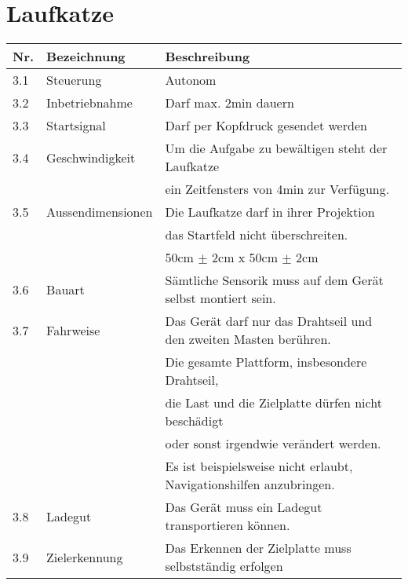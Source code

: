 \documentclass[a4paper]{report}
\begin{document}
\section{Laufkatze}
\begin{tabular}{|l|l|l|}
	\hline 
	\textbf{Nr.} & \textbf{Bezeichnung} & \textbf{Beschreibung} \\
	\hline 
	3.1 & Steuerung & Autonom \\
	\hline
	3.2 & Inbetriebnahme & Darf max. 2min dauern \\
	\hline
	3.3 & Startsignal & Darf per Kopfdruck gesendet werden \\
	\hline
	3.4 & Geschwindigkeit & Um die Aufgabe zu bewältigen steht der Laufkatze\\
	& & ein Zeitfensters von 4min zur Verfügung. \\
	\hline
	3.5 & Aussendimensionen & Die Laufkatze darf in ihrer Projektion\\
	& & das Startfeld nicht überschreiten.\\
	& & 50cm $\pm$ 2cm x 50cm $\pm$ 2cm \\
	\hline
	3.6 & Bauart & Sämtliche Sensorik muss auf dem Gerät selbst montiert sein. \\
	\hline
	3.7 & Fahrweise & Das Gerät darf nur das Drahtseil und den zweiten Masten berühren.\\
	& & Die gesamte Plattform, insbesondere Drahtseil,\\
	& & die Last und die Zielplatte dürfen nicht beschädigt\\
	& & oder sonst irgendwie verändert werden.\\
	& & Es ist beispielsweise nicht erlaubt, Navigationshilfen anzubringen. \\
	\hline
	3.8 & Ladegut & Das Gerät muss ein Ladegut transportieren können. \\
	\hline
	3.9 & Zielerkennung & Das Erkennen der Zielplatte muss selbstständig erfolgen\\
	\hline 
\end{tabular}
\end{document}
